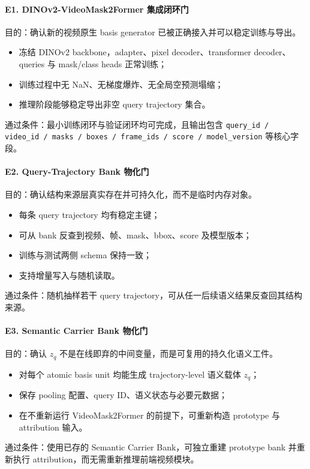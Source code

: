 \documentclass[UTF8]{ctexart}
\begin{document}
\paragraph{E1. DINOv2-VideoMask2Former 集成闭环门}
目的：确认新的视频原生 basis generator 已被正确接入并可以稳定训练与导出。
\begin{itemize}
\item 冻结 DINOv2 backbone，adapter、pixel decoder、transformer decoder、queries 与 mask/class heads 正常训练；
\item 训练过程中无 NaN、无梯度爆炸、无全局空预测塌缩；
\item 推理阶段能够稳定导出非空 query trajectory 集合。
\end{itemize}
通过条件：最小训练闭环与验证闭环均可完成，且输出包含 \texttt{query\_id / video\_id / masks / boxes / frame\_ids / score / model\_version} 等核心字段。

\paragraph{E2. Query-Trajectory Bank 物化门}
目的：确认结构来源层真实存在并可持久化，而不是临时内存对象。
\begin{itemize}
\item 每条 query trajectory 均有稳定主键；
\item 可从 bank 反查到视频、帧、mask、bbox、score 及模型版本；
\item 训练与测试两侧 schema 保持一致；
\item 支持增量写入与随机读取。
\end{itemize}
通过条件：随机抽样若干 query trajectory，可从任一后续语义结果反查回其结构来源。

\paragraph{E3. Semantic Carrier Bank 物化门}
目的：确认 $z_q$ 不是在线即弃的中间变量，而是可复用的持久化语义工件。
\begin{itemize}
\item 对每个 atomic basis unit 均能生成 trajectory-level 语义载体 $z_q$；
\item 保存 pooling 配置、query ID、语义状态与必要元数据；
\item 在不重新运行 VideoMask2Former 的前提下，可重新构造 prototype 与 attribution 输入。
\end{itemize}
通过条件：使用已存的 Semantic Carrier Bank，可独立重建 prototype bank 并重新执行 attribution，而无需重新推理前端视频模块。
\end{document}
